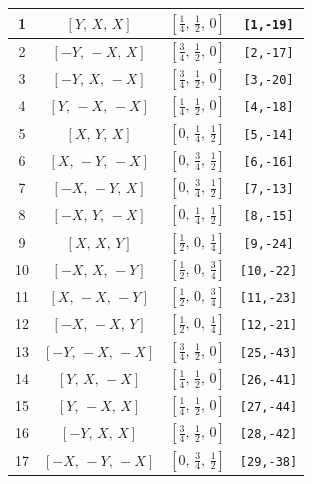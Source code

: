 \documentclass[fleqn,8pt]{jsarticle}
\begin{document}
\begin{longtable}{cccc}
1 & $\left[ Y,\, X,\, X \right]$ & $\left[ \frac{1}{4},\, \frac{1}{2},\, 0 \right]$ & {\tt [1,-19]} \\ \hline
2 & $\left[ - Y,\, - X,\, X \right]$ & $\left[ \frac{3}{4},\, \frac{1}{2},\, 0 \right]$ & {\tt [2,-17]} \\ \hline
3 & $\left[ - Y,\, X,\, - X \right]$ & $\left[ \frac{3}{4},\, \frac{1}{2},\, 0 \right]$ & {\tt [3,-20]} \\ \hline
4 & $\left[ Y,\, - X,\, - X \right]$ & $\left[ \frac{1}{4},\, \frac{1}{2},\, 0 \right]$ & {\tt [4,-18]} \\ \hline
5 & $\left[ X,\, Y,\, X \right]$ & $\left[ 0,\, \frac{1}{4},\, \frac{1}{2} \right]$ & {\tt [5,-14]} \\ \hline
6 & $\left[ X,\, - Y,\, - X \right]$ & $\left[ 0,\, \frac{3}{4},\, \frac{1}{2} \right]$ & {\tt [6,-16]} \\ \hline
7 & $\left[ - X,\, - Y,\, X \right]$ & $\left[ 0,\, \frac{3}{4},\, \frac{1}{2} \right]$ & {\tt [7,-13]} \\ \hline
8 & $\left[ - X,\, Y,\, - X \right]$ & $\left[ 0,\, \frac{1}{4},\, \frac{1}{2} \right]$ & {\tt [8,-15]} \\ \hline
9 & $\left[ X,\, X,\, Y \right]$ & $\left[ \frac{1}{2},\, 0,\, \frac{1}{4} \right]$ & {\tt [9,-24]} \\ \hline
10 & $\left[ - X,\, X,\, - Y \right]$ & $\left[ \frac{1}{2},\, 0,\, \frac{3}{4} \right]$ & {\tt [10,-22]} \\ \hline
11 & $\left[ X,\, - X,\, - Y \right]$ & $\left[ \frac{1}{2},\, 0,\, \frac{3}{4} \right]$ & {\tt [11,-23]} \\ \hline
12 & $\left[ - X,\, - X,\, Y \right]$ & $\left[ \frac{1}{2},\, 0,\, \frac{1}{4} \right]$ & {\tt [12,-21]} \\ \hline
13 & $\left[ - Y,\, - X,\, - X \right]$ & $\left[ \frac{3}{4},\, \frac{1}{2},\, 0 \right]$ & {\tt [25,-43]} \\ \hline
14 & $\left[ Y,\, X,\, - X \right]$ & $\left[ \frac{1}{4},\, \frac{1}{2},\, 0 \right]$ & {\tt [26,-41]} \\ \hline
15 & $\left[ Y,\, - X,\, X \right]$ & $\left[ \frac{1}{4},\, \frac{1}{2},\, 0 \right]$ & {\tt [27,-44]} \\ \hline
16 & $\left[ - Y,\, X,\, X \right]$ & $\left[ \frac{3}{4},\, \frac{1}{2},\, 0 \right]$ & {\tt [28,-42]} \\ \hline
17 & $\left[ - X,\, - Y,\, - X \right]$ & $\left[ 0,\, \frac{3}{4},\, \frac{1}{2} \right]$ & {\tt [29,-38]} \\ \hline

\end{longtable}
\end{document}
